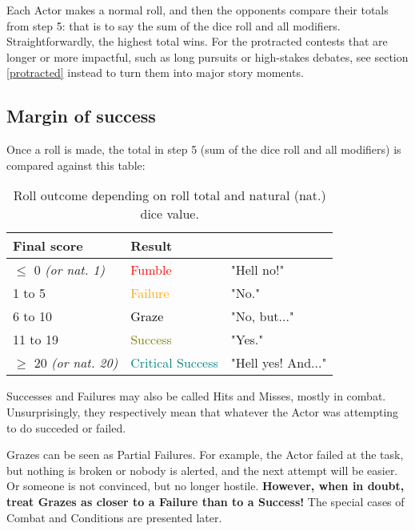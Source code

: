 Each Actor makes a normal roll, and then the opponents compare their totals from step 5: that is to say the sum of the dice roll and all modifiers. Straightforwardly, the highest total wins. For the protracted contests that are longer or more impactful, such as long pursuits or high-stakes debates, see section \ref{protracted} instead to turn them into major story moments.

\subsection{Margin of success}

Once a roll is made, the total in step 5 (sum of the dice roll and all modifiers) is compared against this table:

\begin{table}[h!tbp]
	\begin{center}
		\begin{tabular}{p{2.5cm}p{2.4cm}p{2.6cm}} \toprule
			
			\textbf{Final score} & \textbf{Result} \\ \midrule
			$\leq$ 0 \textit{(or nat. 1)} & \textcolor{red}{Fumble} & "Hell no!" \\
			1 to 5 & \textcolor{orange}{Failure} & "No." \\
			6 to 10 & \textcolor{black}{Graze} & "No, but..." \\
			11 to 19 & \textcolor{olive}{Success} & "Yes." \\
			$\geq$ 20 \textit{(or nat. 20)} & \textcolor{teal}{Critical Success} & "Hell yes! And..." \\
			\bottomrule
		\end{tabular}
	\end{center}
	\caption{Roll outcome depending on roll total and natural (nat.) dice value.}
	\label{success_roll}
\end{table}

Successes and Failures may also be called Hits and Misses, mostly in combat. Unsurprisingly, they respectively mean that whatever the Actor was attempting to do succeded or failed.

Grazes can be seen as Partial Failures. For example, the Actor failed at the task, but nothing is broken or nobody is alerted, and the next attempt will be easier. Or someone is not convinced, but no longer hostile. \textbf{However, when in doubt, treat Grazes as closer to a Failure than to a Success!} The special cases of Combat and Conditions are presented later.


